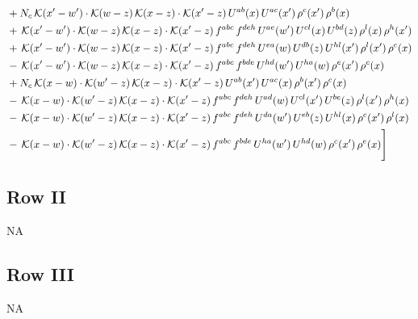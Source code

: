 \documentclass[9pt]{article}
\numberwithin{equation}{section}
\begin{document}
\begin{align}
&+N_{c}\,\mathcal{K}(x'-w')\cdot\mathcal{K}(w-z)\,\mathcal{K}(x-z)\cdot\mathcal{K}(x'-z)\,U^{ab}(x)\,U^{ac}(x')\,\rho^{c}(x')\,\rho^{b}(x)\notag \\ 
&+\,\mathcal{K}(x'-w')\cdot\mathcal{K}(w-z)\,\mathcal{K}(x-z)\cdot\mathcal{K}(x'-z)\,f^{abc}\,f^{deh}\,U^{ae}(w')\,U^{cl}(x)\,U^{bd}(z)\,\rho^{l}(x)\,\rho^{h}(x')\notag \\ 
&+\,\mathcal{K}(x'-w')\cdot\mathcal{K}(w-z)\,\mathcal{K}(x-z)\cdot\mathcal{K}(x'-z)\,f^{abc}\,f^{deh}\,U^{ea}(w)\,U^{db}(z)\,U^{hl}(x')\,\rho^{l}(x')\,\rho^{c}(x)\notag \\ 
&-\,\mathcal{K}(x'-w')\cdot\mathcal{K}(w-z)\,\mathcal{K}(x-z)\cdot\mathcal{K}(x'-z)\,f^{abc}\,f^{bde}\,U^{hd}(w')\,U^{ha}(w)\,\rho^{e}(x')\,\rho^{c}(x)\notag \\ 
&+N_{c}\,\mathcal{K}(x-w)\cdot\mathcal{K}(w'-z)\,\mathcal{K}(x-z)\cdot\mathcal{K}(x'-z)\,U^{ab}(x')\,U^{ac}(x)\,\rho^{b}(x')\,\rho^{c}(x)\notag \\ 
&-\,\mathcal{K}(x-w)\cdot\mathcal{K}(w'-z)\,\mathcal{K}(x-z)\cdot\mathcal{K}(x'-z)\,f^{abc}\,f^{deh}\,U^{ad}(w)\,U^{cl}(x')\,U^{be}(z)\,\rho^{l}(x')\,\rho^{h}(x)\notag \\ 
&-\,\mathcal{K}(x-w)\cdot\mathcal{K}(w'-z)\,\mathcal{K}(x-z)\cdot\mathcal{K}(x'-z)\,f^{abc}\,f^{deh}\,U^{da}(w')\,U^{eb}(z)\,U^{hl}(x)\,\rho^{c}(x')\,\rho^{l}(x)\notag \\ 
&-\,\mathcal{K}(x-w)\cdot\mathcal{K}(w'-z)\,\mathcal{K}(x-z)\cdot\mathcal{K}(x'-z)\,f^{abc}\,f^{bde}\,U^{ha}(w')\,U^{hd}(w)\,\rho^{c}(x')\,\rho^{e}(x)\Bigg]
\end{align}

\subsection{Row II}
\textsc{NA}
\subsection{Row III}
\textsc{NA}
\end{document}
